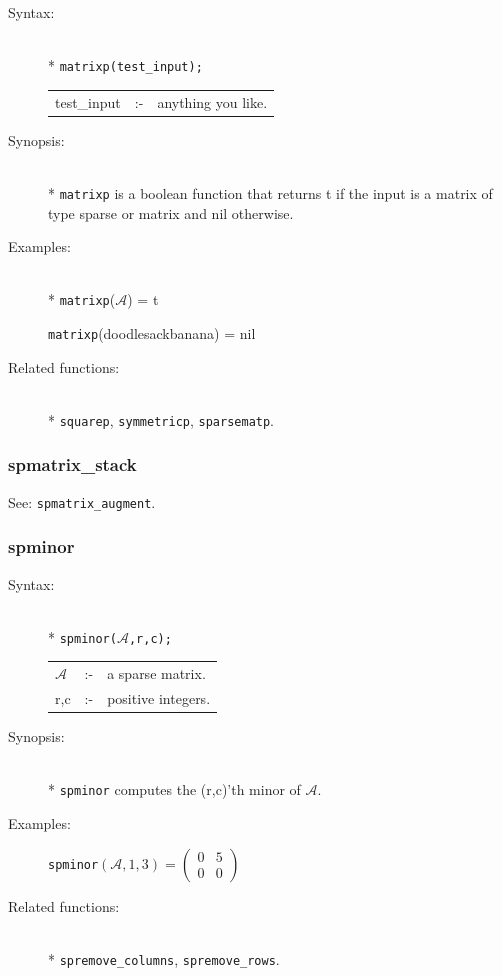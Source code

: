 \begin{description}
\item[Syntax:]\mbox{}\\*
\texttt{matrixp(test\_input);}\\[2mm]
\begin{tabular}{l l l}
test\_input &:-& anything you like.
\end{tabular}

\item[Synopsis:]\mbox{}\\*
\texttt{matrixp} is a boolean function that returns t if
                the input is a matrix of type sparse or matrix and nil otherwise.

\item[Examples:]\mbox{}\\*
\texttt{matrixp}($\mathcal{A}$) = t

\texttt{matrixp}(doodlesackbanana) = nil

\item[Related functions:]\mbox{}\\*
\texttt{squarep}, \texttt{symmetricp}, \texttt{sparsematp}.
\end{description}

\subsubsection{spmatrix\_stack}
\label{sparse:spmatrix_stack}
\hypertarget{operator:SPMATRIX_STACK}{}
See: \texttt{spmatrix\_augment}.


\subsubsection{spminor}
\label{sparse:spminor}
\hypertarget{operator:SPMINOR}{}

\begin{description}
\item[Syntax:]\mbox{}\\*
{\tt spminor($\mathcal{A}$,r,c);}\\[2mm]
\begin{tabular}{l l l}
$\mathcal{A}$ &:-& a sparse matrix. \\
r,c        &:-& positive integers.
\end{tabular}

\item[Synopsis:]\mbox{}\\*
                \texttt{spminor} computes the (r,c)'th minor of $\mathcal{A}$.

\item[Examples:]
\texttt{spminor}\((\mathcal{A},1,3) =
        \begin{pmatrix} 0 & 5 \\ 0 & 0  \end{pmatrix}\)

\item[Related functions:]\mbox{}\\*
 \texttt{spremove\_columns}, \texttt{spremove\_rows}.
\end{description}

